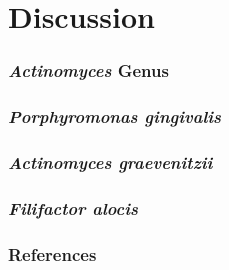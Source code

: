 \documentclass{beamer}
\begin{document}
    \section{Discussion}
    \begin{frame}
        \frametitle{\textit{Actinomyces} Genus}
    \end{frame}

    \begin{frame}
        \frametitle{\textit{Porphyromonas gingivalis}}
    \end{frame}

    \begin{frame}
        \frametitle{\textit{Actinomyces graevenitzii}}
    \end{frame}

    \begin{frame}
        \frametitle{\textit{Filifactor alocis}}
    \end{frame}

    \begin{frame}[allowframebreaks]
        \frametitle{References}
        
        
    \end{frame}
\end{document}
